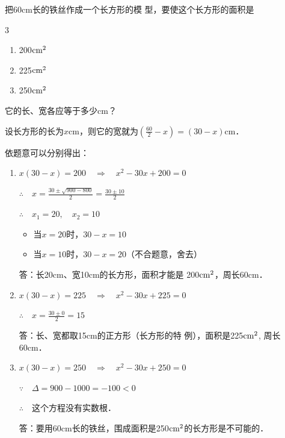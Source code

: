 \begin{example}
    把60cm长的铁丝作成一个长方形的模
    型，要使这个长方形的面积是
    \begin{multicols}{3}
        \begin{enumerate}
        \item 200${\rm cm}^2$
        \item 225${\rm cm}^2$
        \item 250${\rm cm}^2$
    \end{enumerate}        
    \end{multicols}
        
它的长、宽各应等于多少cm？
\end{example}


\begin{figure}[htp]
    \centering
    \caption{}
\end{figure}

\begin{solution}
    设长方形的长为$x$cm，则它的宽就为$\left(\frac{60}{2}-x\right)=(30-x)$cm．

    依题意可以分别得出：
\begin{enumerate}
    \item $x(30-x)=200\quad \Rightarrow\quad x^2-30x+200=0$

    $\therefore\quad x=\frac{30\pm \sqrt{900-800}}{2}=\frac{30\pm 10}{2}$

    $\therefore\quad x_1=20,\quad x_2=10$
\begin{itemize}
    \item 当$x=20$时，$30-x=10$
    \item 当$x=10$时，$30-x=20$（不合题意，舍去）
\end{itemize}

答：长20cm、宽10cm的长方形，面积才能是
200${\rm cm}^2$，周长60cm．

\item $x(30-x)=225\quad \Rightarrow\quad x^2-30x+225=0$

$\therefore\quad x=\frac{30\pm 0}{2}=15$

答：长、宽都取15cm的正方形（长方形的特
例），面积是225${\rm cm}^2$, 周长60cm．

\item $x(30-x)=250\quad \Rightarrow\quad x^2-30x+250=0$

$\because\quad \Delta =900-1000=-100<0$

$\therefore\quad $这个方程没有实数根．

答：要用60cm长的铁丝，围成面积是250${\rm cm}^2$的长方形是不可能的．
\end{enumerate}
\end{solution}


